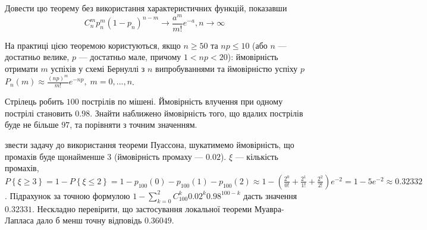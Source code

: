 \begin{exercise}
    Довести цю теорему без використання характеристичних функцій, показавши
    $$C_n^m p_n^m (1-p_n)^{n-m} \to \frac{a^m}{m!}e^{-a}, n\to\infty$$
\end{exercise}
На практиці цією теоремою користуються, якщо $n \geq 50$ та $np \leq 10$ 
(або $n$ --- достатньо велике, $p$ --- достатньо мале, причому $1 < np < 20$):
ймовірність отримати $m$ успіхів у схемі Бернуллі з $n$ випробуваннями та ймовірністю успіху $p$
$P_n(m) \approx \frac{(np)^m}{m!} e^{-np}, \; m = 0, ..., n$.
\begin{example}
    Стрілець робить $100$ пострілів по мішені. 
    Ймовірність влучення при одному пострілі становить $0.98$. 
    Знайти наближено ймовірність того, що вдалих пострілів буде не більше $97$, та порівняти з точним значенням.
    
     звести задачу до використання теореми Пуассона, шукатимемо ймовірність, що промахів буде щонайменше $3$ (ймовірність
    промаху --- $0.02$). $\xi$ --- кількість промахів,
    $P\left\{ \xi \geq 3\right\} = 1 - P\left\{ \xi \leq 2\right\} = 
    1 - p_{100}(0) - p_{100}(1) - p_{100}(2)
    \approx 1 - \left( \frac{2^0}{0!} + \frac{2^1}{1!} + \frac{2^2}{2!}\right)e^{-2} = 1 - 5e^{-2} \approx 0.32332$.
    Підрахунок за точною формулою $1 - \sum\limits_{k=0}^2 C_{100}^k 0.02^k 0.98^{100-k}$ дасть значення $0.32331$. Нескладно
    перевірити, що застосування локальної теореми Муавра-Лапласа дало б менш точну відповідь $0.36049$.
\end{example}